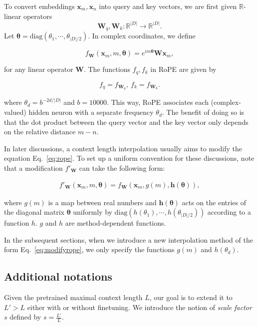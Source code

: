 To convert embeddings ${\bm{x}}_m, {\bm{x}}_n$ into query and key vectors, we are first given $\mathbb{R}$-linear operators 
\[
{\bm{W}}_q, {\bm{W}}_k: \mathbb{R}^{|D|}\rightarrow \mathbb{R}^{|D|}.
\]
Let $\bm{\theta} = \text{diag}(\theta_1, \cdots, \theta_{|D|/2})$. In complex coordinates, we define

\begin{equation}\label{eq:rope}
f_{{\bm{W}}}({\bm{x}}_m, m, \bm{\theta}) = e^{im\bm{\theta}}{\bm{W}}{\bm{x}}_m,
\end{equation}

for any linear operator ${\bm{W}}$. The functions $f_q, f_k$ in RoPE are given by

\begin{equation}
    f_q = f_{{\bm{W}}_q}, ~ f_k = f_{{\bm{W}}_k}.
\end{equation}

where $\theta_d = b^{-2d/|D|}$ and $b=10000$. This way, RoPE associates each (complex-valued) hidden neuron with a separate frequency $\theta_d$. The benefit of doing so is that the dot product between the query vector and the key vector only depends on the relative distance $m - n$.

In later discussions, a context length interpolation usually aims to modify the equation Eq.~\ref{eq:rope}. To set up a uniform convention for these discussions, note that a modification $f'_{{\bm{W}}}$ can take the following form:

\begin{align}\label{eq:modifyrope}
    f'_{{\bm{W}}}({\bm{x}}_m, m, \bm{\theta}) = f_{{\bm{W}}}({\bm{x}}_m, g(m), {\bm{h}}(\bm{\theta})),
\end{align}

where $g(m)$ is a map between real numbers and ${\bm{h}}(\bm{\theta})$ acts on the entries of the diagonal matrix $\bm{\theta}$ uniformly by $\text{diag}(h(\theta_1), \cdots, h(\theta_{|D|/2}))$ according to a function $h$. $g$ and $h$ are method-dependent functions. 

In the subsequent sections, when we introduce a new interpolation method of the form Eq.~\ref{eq:modifyrope}, we only specify the functions $g(m)$ and $h(\theta_d)$.

\subsection{Additional notations}\label{sec:related-work}
Given the pretrained maximal context length $L$, our goal is to extend it to $L' > L$ either with or without finetuning. We introduce the notion of {\it scale factor} $s$ defined by $s = \frac{L'}{L}$.

